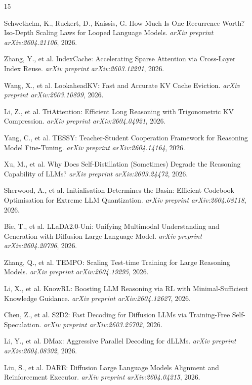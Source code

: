 \documentclass[11pt]{article}
\begin{document}
\begin{thebibliography}{15}

Schwethelm, K., Ruckert, D., Kaissis, G.
\newblock How Much Is One Recurrence Worth? Iso-Depth Scaling Laws for Looped Language Models.
\newblock \emph{arXiv preprint arXiv:2604.21106}, 2026.

Zhang, Y., et al.
\newblock IndexCache: Accelerating Sparse Attention via Cross-Layer Index Reuse.
\newblock \emph{arXiv preprint arXiv:2603.12201}, 2026.

Wang, X., et al.
\newblock LookaheadKV: Fast and Accurate KV Cache Eviction.
\newblock \emph{arXiv preprint arXiv:2603.10899}, 2026.

Li, Z., et al.
\newblock TriAttention: Efficient Long Reasoning with Trigonometric KV Compression.
\newblock \emph{arXiv preprint arXiv:2604.04921}, 2026.

Yang, C., et al.
\newblock TESSY: Teacher-Student Cooperation Framework for Reasoning Model Fine-Tuning.
\newblock \emph{arXiv preprint arXiv:2604.14164}, 2026.

Xu, M., et al.
\newblock Why Does Self-Distillation (Sometimes) Degrade the Reasoning Capability of LLMs?
\newblock \emph{arXiv preprint arXiv:2603.24472}, 2026.

Sherwood, A., et al.
\newblock Initialisation Determines the Basin: Efficient Codebook Optimisation for Extreme LLM Quantization.
\newblock \emph{arXiv preprint arXiv:2604.08118}, 2026.

Bie, T., et al.
\newblock LLaDA2.0-Uni: Unifying Multimodal Understanding and Generation with Diffusion Large Language Model.
\newblock \emph{arXiv preprint arXiv:2604.20796}, 2026.

Zhang, Q., et al.
\newblock TEMPO: Scaling Test-time Training for Large Reasoning Models.
\newblock \emph{arXiv preprint arXiv:2604.19295}, 2026.

Li, X., et al.
\newblock KnowRL: Boosting LLM Reasoning via RL with Minimal-Sufficient Knowledge Guidance.
\newblock \emph{arXiv preprint arXiv:2604.12627}, 2026.

Chen, Z., et al.
\newblock S2D2: Fast Decoding for Diffusion LLMs via Training-Free Self-Speculation.
\newblock \emph{arXiv preprint arXiv:2603.25702}, 2026.

Li, Y., et al.
\newblock DMax: Aggressive Parallel Decoding for dLLMs.
\newblock \emph{arXiv preprint arXiv:2604.08302}, 2026.

Liu, S., et al.
\newblock DARE: Diffusion Large Language Models Alignment and Reinforcement Executor.
\newblock \emph{arXiv preprint arXiv:2604.04215}, 2026.

\end{thebibliography}
\end{document}

